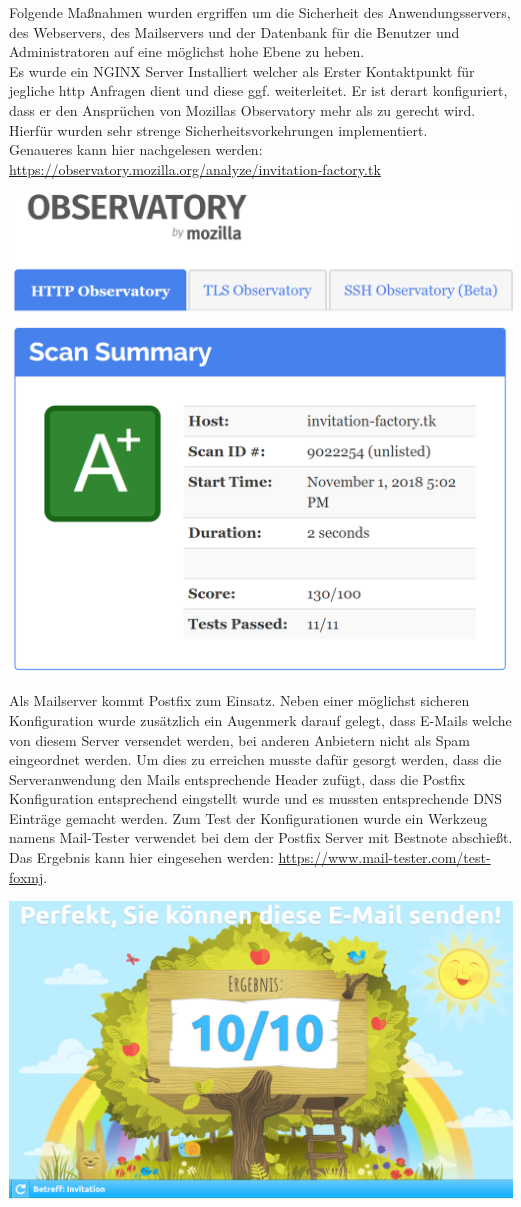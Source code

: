 \documentclass[landscape,a0paper,fontscale=0.35]{baposter} %
\begin{document}
\begin{poster}
{Folgende Maßnahmen wurden ergriffen um die Sicherheit des Anwendungsservers, des Webservers, des Mailservers und der Datenbank für die Benutzer und Administratoren auf eine möglichst hohe Ebene zu heben.\\ 
Es wurde ein NGINX Server Installiert welcher als Erster Kontaktpunkt für jegliche http Anfragen dient und diese ggf. weiterleitet. Er ist derart konfiguriert, dass er den Ansprüchen von Mozillas Observatory mehr als zu gerecht wird. Hierfür wurden sehr strenge Sicherheitsvorkehrungen implementiert.\\ Genaueres kann hier nachgelesen werden: \url{https://observatory.mozilla.org/analyze/invitation-factory.tk}
\begin{center}
	\includegraphics[width=0.5\linewidth]{Observatory.PNG}
\end{center}
Als Mailserver kommt Postfix zum Einsatz. Neben einer möglichst sicheren Konfiguration wurde zusätzlich ein Augenmerk darauf gelegt, dass E-Mails welche von diesem Server versendet werden, bei anderen Anbietern nicht als Spam eingeordnet werden. Um dies zu erreichen musste dafür gesorgt werden, dass die Serveranwendung den Mails entsprechende Header zufügt, dass die Postfix Konfiguration entsprechend eingstellt wurde und es mussten entsprechende DNS Einträge gemacht werden. Zum Test der Konfigurationen wurde ein Werkzeug namens Mail-Tester verwendet bei dem der Postfix Server mit Bestnote abschießt. Das Ergebnis kann hier eingesehen werden: \url{https://www.mail-tester.com/test-foxmj}.
\begin{center}
	\includegraphics[width=0.5\linewidth]{E-Mail_test.PNG}

\end{center}}
\end{poster}
\end{document}
